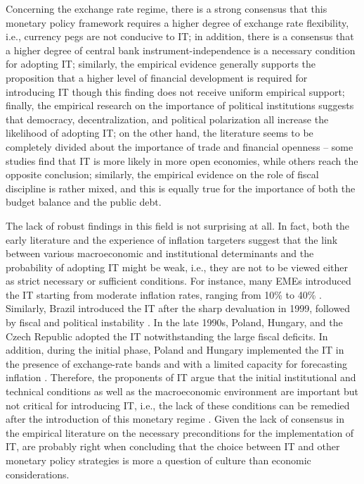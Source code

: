 \documentclass{article}
\begin{document}
Concerning the exchange rate regime, there is a strong consensus that this monetary policy framework requires a higher degree of exchange rate flexibility, i.e., currency pegs are not conducive to IT; in addition, there is a consensus that a higher degree of central bank instrument-independence is a necessary condition for adopting IT; similarly, the empirical evidence generally supports the proposition that a higher level of financial development is required for introducing IT though this finding does not receive uniform empirical support; finally, the empirical research on the importance of political institutions suggests that democracy, decentralization, and political polarization all increase the likelihood of adopting IT; on the other hand, the literature seems to be completely divided about the importance of trade and financial openness – some studies find that IT is more likely in more open economies, while others reach the opposite conclusion; similarly, the empirical evidence on the role of fiscal discipline is rather mixed, and this is equally true for the importance of both the budget balance and the public debt.

The lack of robust findings in this field is not surprising at all. In fact, both the early literature and the experience of inflation targeters suggest that the link between various macroeconomic and institutional determinants and the probability of adopting IT might be weak, i.e., they are not to be viewed either as strict necessary or sufficient conditions. For instance, many EMEs introduced the IT starting from moderate inflation rates, ranging from 10\% to 40\% \citep{Mishkin2002}. Similarly, Brazil introduced the IT after the sharp devaluation in 1999, followed by fiscal and political instability \citep{Mishkin2004b, Mishkin2002}. In the late 1990s, Poland, Hungary, and the Czech Republic adopted the IT notwithstanding the large fiscal deficits. In addition, during the initial phase, Poland and Hungary implemented the IT in the presence of exchange-rate bands and with a limited capacity for forecasting inflation \citep{Jonas2007}. Therefore, the proponents of IT argue that the initial institutional and technical conditions as well as the macroeconomic environment are important but not critical for introducing IT, i.e., the lack of these conditions can be remedied after the introduction of this monetary regime \citep{Batini2007, IMF2006, Mishkin2007}. Given the lack of consensus in the empirical literature on the necessary preconditions for the implementation of IT, \citet{neumann2002} are probably right when concluding that the choice between IT and other monetary policy strategies is more a question of culture than economic considerations.
\end{document}
